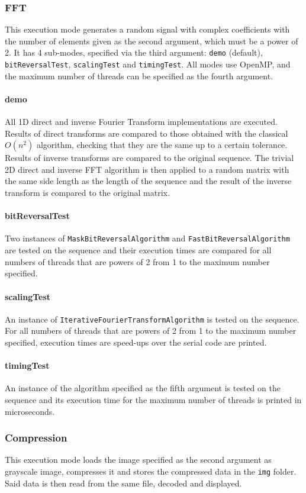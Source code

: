 \subsubsection{FFT}
This execution mode generates a random signal with complex coefficients with the number of elements given as the second argument, which must be a power of 2. It has 4 sub-modes, specified via the third argument: \texttt{demo} (default), \texttt{bitReversalTest}, \texttt{scalingTest} and \texttt{timingTest}. All modes use OpenMP, and the maximum number of threads can be specified as the fourth argument.
\paragraph{demo} All 1D direct and inverse Fourier Transform implementations are executed. Results of direct transforms are compared to those obtained with the classical $O(n^2)$ algorithm, checking that they are the same up to a certain tolerance. Results of inverse transforms are compared to the original sequence. The trivial 2D direct and inverse FFT algorithm is then applied to a random matrix with the same side length as the length of the sequence and the result of the inverse transform is compared to the original matrix.
\paragraph{bitReversalTest} Two instances of \texttt{Mask\-Bit\-Reversal\-Algorithm} and \texttt{Fast\-Bit\-Reversal\-Algorithm} are tested on the sequence and their execution times are compared for all numbers of threads that are powers of 2 from 1 to the maximum number specified.
\paragraph{scalingTest} An instance of \texttt{Iterative\-Fourier\-Transform\-Algorithm} is tested on the sequence. For all numbers of threads that are powers of 2 from 1 to the maximum number specified, execution times are speed-ups over the serial code are printed.
\paragraph{timingTest} An instance of the algorithm specified as the fifth argument is tested on the sequence and its execution time for the maximum number of threads is printed in microseconds.

\subsubsection{Compression}
This execution mode loads the image specified as the second argument as grayscale image, compresses it and stores the compressed data in the \texttt{img} folder. Said data is then read from the same file, decoded and displayed. 

